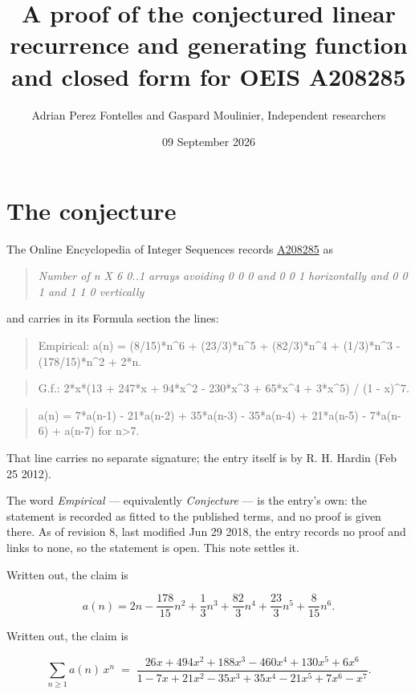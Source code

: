 \documentclass[11pt]{article}
\title{A proof of the conjectured linear recurrence and generating function and closed form for OEIS A208285}
\author{Adrian Perez Fontelles and Gaspard Moulinier, Independent researchers}
\date{09 September 2026}
\theoremstyle{definition}
\begin{document}
\maketitle
\section{The conjecture}

The Online Encyclopedia of Integer Sequences records \href{https://oeis.org/A208285}{A208285} as

\begin{quote}\itshape Number of n X 6 0..1 arrays avoiding 0 0 0 and 0 0 1 horizontally and 0 0 1 and 1 1 0 vertically\end{quote}

and carries in its Formula section the lines:

\begin{quote}\ttfamily Empirical: a(n) = (8/15)*n\textasciicircum{}6 + (23/3)*n\textasciicircum{}5 + (82/3)*n\textasciicircum{}4 + (1/3)*n\textasciicircum{}3 - (178/15)*n\textasciicircum{}2 + 2*n.\end{quote}

\begin{quote}\ttfamily G.f.: 2*x*(13 + 247*x + 94*x\textasciicircum{}2 - 230*x\textasciicircum{}3 + 65*x\textasciicircum{}4 + 3*x\textasciicircum{}5) / (1 - x)\textasciicircum{}7.\end{quote}

\begin{quote}\ttfamily a(n) = 7*a(n-1) - 21*a(n-2) + 35*a(n-3) - 35*a(n-4) + 21*a(n-5) - 7*a(n-6) + a(n-7) for n>7.\end{quote}

That line carries no separate signature; the entry itself is by R. H. Hardin (Feb 25 2012).

The word {\itshape Empirical} --- equivalently {\itshape Conjecture} --- is the entry's own: the statement is recorded as fitted to the published terms, and no proof is given there. As of revision 8, last modified Jun 29 2018, the entry records no proof and links to none, so the statement is open. This note settles it.

Written out, the claim is

\[a(n) = 2n - \frac{178}{15}n^{2} + \frac{1}{3}n^{3} + \frac{82}{3}n^{4} + \frac{23}{3}n^{5} + \frac{8}{15}n^{6}.\]

Written out, the claim is

\[\sum_{n \ge 1} a(n)\,x^n \;=\; \frac{26x + 494x^{2} + 188x^{3} - 460x^{4} + 130x^{5} + 6x^{6}}{1 - 7x + 21x^{2} - 35x^{3} + 35x^{4} - 21x^{5} + 7x^{6} - x^{7}}.\]
\end{document}
